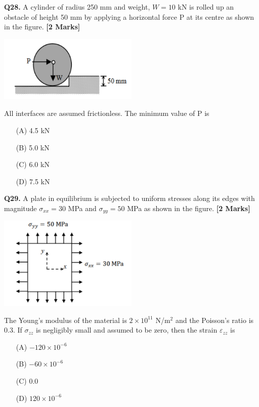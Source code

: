 \documentclass[11pt]{article}
\newcommand{\questionb}[2]{
    \noindent\textbf{Q#2.} #1 \hfill \textbf{[2 Marks]}
}
\begin{document}
\questionb{A cylinder of radius 250 mm and weight, \( W = 10 \) kN is rolled up an obstacle of height 50 mm by applying a horizontal force P at its centre as shown in the figure.}{28}
\begin{center}
\includegraphics[width=0.5\textwidth]{figures/q28}
\end{center}
All interfaces are assumed frictionless. The minimum value of P is
\begin{enumerate}
    \item[(A)] 4.5 kN
    \item[(B)] 5.0 kN
    \item[(C)] 6.0 kN
    \item[(D)] 7.5 kN
\end{enumerate}
\vspace{0.5cm}

\questionb{A plate in equilibrium is subjected to uniform stresses along its edges with magnitude \( \sigma_{xx} = 30 \) MPa and \( \sigma_{yy} = 50 \) MPa as shown in the figure.}{29}
\begin{center}
\includegraphics[width=0.5\textwidth]{figures/q29}
\end{center}
The Young's modulus of the material is \( 2 \times 10^{11} \) N/m\(^2\) and the Poisson's ratio is 0.3. If \( \sigma_{zz} \) is negligibly small and assumed to be zero, then the strain \( \varepsilon_{zz} \) is
\begin{enumerate}
    \item[(A)] \( -120 \times 10^{-6} \)
    \item[(B)] \( -60 \times 10^{-6} \)
    \item[(C)] 0.0
    \item[(D)] \( 120 \times 10^{-6} \)
\end{enumerate}
\vspace{0.5cm}
\end{document}
